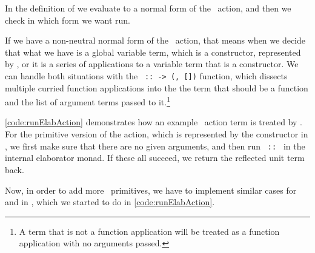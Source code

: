 In the definition of  we evaluate  to a normal form
of the \Elab\ action, and then we check in  which form we want run.

If we have a non-neutral normal form of the \Elab\ action, that means when we decide
that what we have is a global variable term, which is a constructor, represented by
, or it is a series of applications to a variable term that is a
constructor. We can handle both situations with the
\texttt{ ::  -> (, [])} function,
which dissects multiple curried function applications into the the term
that should be a function and the list of argument terms passed to
it.\footnote{A term that is not a function application will be treated as a
function application with no arguments passed.}

\autoref{code:runElabAction} demonstrates how an example \Elab\ action
term is treated by . For the primitive version of the 
action, which is represented by the  constructor in \Elab,
we first make sure that there are no given arguments, and then run
\texttt{ ::   \ty{()}} in the internal elaborator
monad. If these all succeed, we return the reflected unit term back.

Now, in order to add more \Elab\ primitives, we have to implement similar cases
for  and  in , which
we started to do in \autoref{code:runElabAction}.

